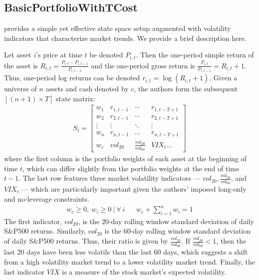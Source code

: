 \subsection{BasicPortfolioWithTCost}

\cite{drl_mvo} provides a simple yet effective state space setup augmented with 
volatility indicators that characterize market trends. We provide a brief description here.

Let asset $i$'s price at time $t$ be denoted $P_{i, t}$. Then the one-period simple return of the asset 
is $R_{i, t} = \frac{P_{i, t} - P_{i, t-1}}{P_{i, t-1}}$ and the one-period gross return is $\frac{P_{i, t}}{P_{i, t-1}} = R_{i, t} + 1$. 
Thus, one-period log returns can be denoted $r_{i, t} = \log(R_{i, t} + 1)$. Given a universe of 
$n$ assets and cash denoted by $c$, the authors form the subsequent $[(n + 1) \times T]$ state matrix:
\begin{align*}
  S_t = \begin{bmatrix}
    w_1 & r_{1, t-1} & \cdots & r_{1, t - T + 1}\\
    w_2 & r_{2, t-1} & \cdots & r_{2, t - T + 1}\\
    \vdots & \vdots & \ddots & \vdots\\
    w_n & r_{n, t-1} & \hdots & r_{n, t - T + 1}\\
    w_c & vol_{20} & \frac{vol_{20}}{vol_{60}} & VIX_t \ldots
  \end{bmatrix}
\end{align*}
where the first column is the portfolio weights of each asset at the beginning of time $t$, which 
can differ slightly from the portfolio weights at the end of time $t-1$. The last row features three
market volatility indicators --- $vol_{20}, \frac{vol_{20}}{vol_{60}}$, and $VIX_t$ --- which are 
particularly important given the authors' imposed long-only and no-leverage constraints.
\begin{align*}
  w_c \geq 0, \ w_i \geq 0 \:|\: \forall \ i&&
  w_c + \sum_{i=1}^n w_i = 1
\end{align*}
The first indicator, $vol_{20}$, is the $20$-day rolling window standard deviation of daily S$\&$P500 returns. 
Similarly, $vol_{20}$ is the $60$-day rolling window standard deviation of daily S$\&$P500 returns. Thus, their ratio 
is given by $\frac{vol_{20}}{vol_{60}}$. If $\frac{vol_{20}}{vol_{60}} < 1$, then the
last $20$ days have been less volatile than the last $60$ days, which suggests a shift from a high volatility 
market trend to a lower volatility market trend. Finally, the last indicator $VIX$ is a measure 
of the stock market's expected volatility.

